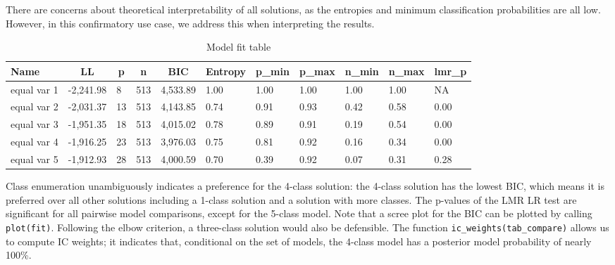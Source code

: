 \documentclass[
  man,floatsintext]{apa6}
\begin{document}
There are concerns about theoretical interpretability of all solutions, as the entropies and minimum classification probabilities are all low.
However, in this confirmatory use case, we address this when interpreting the results.

\begin{table}[tbp]

\begin{center}
\begin{threeparttable}

\caption{\label{tab:tabfit}Model fit table}

\begin{tabular}{lllllllllll}
\toprule
Name & \multicolumn{1}{c}{LL} & \multicolumn{1}{c}{p} & \multicolumn{1}{c}{n} & \multicolumn{1}{c}{BIC} & \multicolumn{1}{c}{Entropy} & \multicolumn{1}{c}{p\_min} & \multicolumn{1}{c}{p\_max} & \multicolumn{1}{c}{n\_min} & \multicolumn{1}{c}{n\_max} & \multicolumn{1}{c}{lmr\_p}\\
\midrule
equal var 1 & -2,241.98 & 8 & 513 & 4,533.89 & 1.00 & 1.00 & 1.00 & 1.00 & 1.00 & NA\\
equal var 2 & -2,031.37 & 13 & 513 & 4,143.85 & 0.74 & 0.91 & 0.93 & 0.42 & 0.58 & 0.00\\
equal var 3 & -1,951.35 & 18 & 513 & 4,015.02 & 0.78 & 0.89 & 0.91 & 0.19 & 0.54 & 0.00\\
equal var 4 & -1,916.25 & 23 & 513 & 3,976.03 & 0.75 & 0.81 & 0.92 & 0.16 & 0.34 & 0.00\\
equal var 5 & -1,912.93 & 28 & 513 & 4,000.59 & 0.70 & 0.39 & 0.92 & 0.07 & 0.31 & 0.28\\
\bottomrule
\end{tabular}

\end{threeparttable}
\end{center}

\end{table}

Class enumeration unambiguously indicates a preference for the 4-class solution: the 4-class solution has the lowest BIC, which means it is preferred over all other solutions including a 1-class solution and a solution with more classes.
The p-values of the LMR LR test are significant for all pairwise model comparisons, except for the 5-class model.
Note that a scree plot for the BIC can be plotted by calling \texttt{plot(fit)}.
Following the elbow criterion, a three-class solution would also be defensible.
The function \texttt{ic\_weights(tab\_compare)} allows us to compute IC weights; it indicates that, conditional on the set of models, the 4-class model has a posterior model probability of nearly 100\%.
\end{document}
